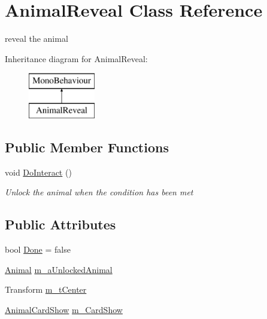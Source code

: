\hypertarget{class_animal_reveal}{}\section{Animal\+Reveal Class Reference}
\label{class_animal_reveal}


reveal the animal  


Inheritance diagram for Animal\+Reveal\+:\begin{figure}[H]
\begin{center}
\leavevmode
\includegraphics[height=2.000000cm]{class_animal_reveal}
\end{center}
\end{figure}
\subsection*{Public Member Functions}
\begin{DoxyCompactItemize}
\item 
void \mbox{\hyperlink{class_animal_reveal_a9570da965f4ba4ace6fa35efdcd0450b}{Do\+Interact}} ()
\begin{DoxyCompactList}\small\item\em Unlock the animal when the condition has been met \end{DoxyCompactList}\end{DoxyCompactItemize}
\subsection*{Public Attributes}
\begin{DoxyCompactItemize}
\item 
bool \mbox{\hyperlink{class_animal_reveal_aaf56dad319f6efe32bc2c6c2f65e71aa}{Done}} = false
\item 
\mbox{\hyperlink{class_animal}{Animal}} \mbox{\hyperlink{class_animal_reveal_a18b14a2a76ac60ae8eb2f5161b84b019}{m\+\_\+a\+Unlocked\+Animal}}
\item 
Transform \mbox{\hyperlink{class_animal_reveal_acd26588c1ef170e01892b2feea2ac0db}{m\+\_\+t\+Center}}
\item 
\mbox{\hyperlink{class_animal_card_show}{Animal\+Card\+Show}} \mbox{\hyperlink{class_animal_reveal_a3555f60772d79b3e9e2dfe275843e7a3}{m\+\_\+\+Card\+Show}}
\end{DoxyCompactItemize}


